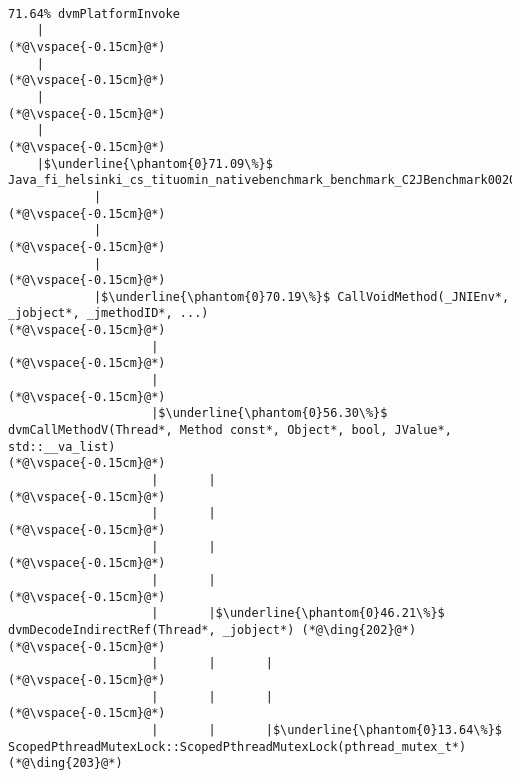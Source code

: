 \begin{lstlisting}[caption=Metodikutsu C$\to$Java 20 viiteparametrilla, label=profile:C2JBenchmark00206, numberbychapter=true, frame=lines, float, floatplacement=t]

71.64% dvmPlatformInvoke
    |
(*@\vspace{-0.15cm}@*)
    |
(*@\vspace{-0.15cm}@*)
    |
(*@\vspace{-0.15cm}@*)
    |
(*@\vspace{-0.15cm}@*)
    |$\underline{\phantom{0}71.09\%}$ Java_fi_helsinki_cs_tituomin_nativebenchmark_benchmark_C2JBenchmark00206_runInternal
            |
(*@\vspace{-0.15cm}@*)
            |
(*@\vspace{-0.15cm}@*)
            |
(*@\vspace{-0.15cm}@*)
            |$\underline{\phantom{0}70.19\%}$ CallVoidMethod(_JNIEnv*, _jobject*, _jmethodID*, ...)
(*@\vspace{-0.15cm}@*)
                    |
(*@\vspace{-0.15cm}@*)
                    |
(*@\vspace{-0.15cm}@*)
                    |$\underline{\phantom{0}56.30\%}$ dvmCallMethodV(Thread*, Method const*, Object*, bool, JValue*, std::__va_list)
(*@\vspace{-0.15cm}@*)
                    |       |
(*@\vspace{-0.15cm}@*)
                    |       |
(*@\vspace{-0.15cm}@*)
                    |       |
(*@\vspace{-0.15cm}@*)
                    |       |
(*@\vspace{-0.15cm}@*)
                    |       |$\underline{\phantom{0}46.21\%}$ dvmDecodeIndirectRef(Thread*, _jobject*) (*@\ding{202}@*)
(*@\vspace{-0.15cm}@*)
                    |       |       |
(*@\vspace{-0.15cm}@*)
                    |       |       |
(*@\vspace{-0.15cm}@*)
                    |       |       |$\underline{\phantom{0}13.64\%}$ ScopedPthreadMutexLock::ScopedPthreadMutexLock(pthread_mutex_t*) (*@\ding{203}@*)

\end{lstlisting}
